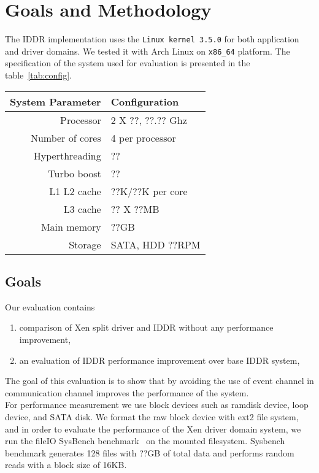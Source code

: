 \section{Goals and Methodology}
The IDDR implementation uses the \texttt{Linux kernel 3.5.0} for both application and driver domains. We tested it with Arch Linux on \texttt{x86\_64} platform. The specification of the system used for evaluation is presented in the table~\ref{tab:config}. 

\begin{center}
\begin{tabular}{|r|l|} 
  \hline
  \label{tab:config}
  System Parameter & Configuration \\
  \hline
  Processor & 2 X ??, ??.?? Ghz \\
  Number of cores & 4 per processor \\
  Hyperthreading & ?? \\
  Turbo boost & ?? \\
  L1 L2 cache & ??K/??K per core \\
  L3 cache & ?? X ??MB \\
  Main memory & ??GB \\
  Storage & SATA, HDD ??RPM \\
  \hline 
\end{tabular}
\end{center}
 
\subsection{Goals}
Our evaluation contains 
\begin{enumerate} 
\item comparison of Xen split driver and IDDR without any performance improvement, 
\item an evaluation of IDDR performance improvement over base IDDR system,
\end{enumerate}
The goal of this evaluation is to show that by avoiding the use of event channel in communication channel improves the performance of the system. 
\\
For performance measurement we use block devices such as ramdisk device, loop device, and SATA disk. We format the raw block device with ext2 file system, and in order to evaluate the performance of the Xen driver domain system, we run the fileIO SysBench benchmark~\cite{sysbench} on the mounted filesystem. Sysbench benchmark generates 128 files with ??GB of total data and performs random reads with a block size of 16KB. 

